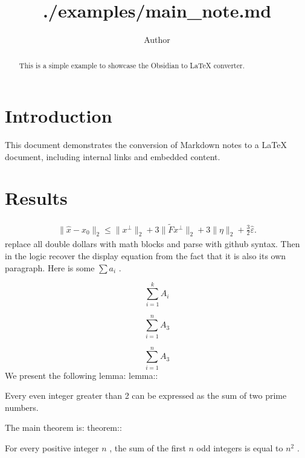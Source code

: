 \documentclass{article}
\title{./examples/main_note.md}
\author{Author}
\begin{document}
\maketitle
\begin{abstract}
This is a simple example to showcase the Obsidian to LaTeX converter.


\end{abstract}

\section{Introduction}
\label{section:Introduction}
This document demonstrates the conversion of Markdown notes to a LaTeX document, including internal links and embedded content.

\section{Results}
\label{section:Results}

\begin{align*}
  \|\hat x - x_0\|_2
  \leq \|x^\perp\|_2 + 3\|\tilde{F}x^\perp\|_2 + 3 \|\eta\|_2 + \frac{3}{2}\hat\varepsilon.
\end{align*}
replace all double dollars with math blocks and parse with github syntax. Then in the logic recover the display equation from the fact that it is also its own paragraph.
Here is some  $\sum a_i$ .

\begin{equation*}
\sum_{i=1}^k A_i
\end{equation*}

\begin{equation*}
\sum_{i=1}^n A_3
\end{equation*}

\begin{equation*}
\sum_{i=1}^n A_3
\end{equation*}
We present the following lemma:
lemma::
\begin{lemma}[lemma_1]
\label{lemma_1}
Every even integer greater than 2 can be expressed as the sum of two prime numbers.


\end{lemma}

The main theorem is:
theorem::
\begin{lemma}[theorem_1]
\label{theorem_1}
For every positive integer  $n$ , the sum of the first  $n$  odd integers is equal to  $n^2$ .


\end{lemma}
\end{document}
